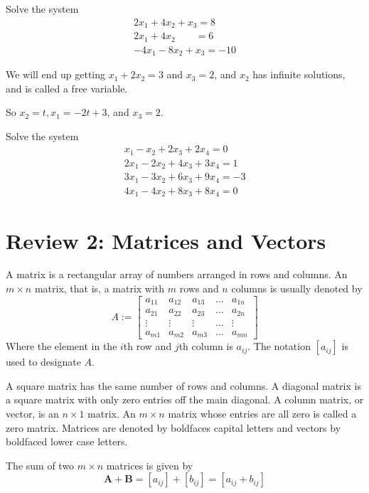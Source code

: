 \documentclass[../diffeq.tex]{subfiles}
\begin{document}
\begin{example}
    Solve the system 
    \begin{align*}
        2x_1+4x_2+x_3=8\\
        2x_1+4x_2\qquad =6\\
        -4x_1-8x_2+x_3=-10
    \end{align*}

    We will end up getting $x_1+2x_2=3$ and $x_3=2$, and $x_2$ has infinite solutions, and is called a free variable.

    So $x_2=t, x_1=-2t+3$, and $x_3=2$.
\end{example}

\ex Solve the system 
\begin{align*}
    x_1-x_2+2x_3+2x_4=0\\
    2x_1-2x_2+4x_3+3x_4=1\\
    3x_1-3x_2+6x_3+9x_4=-3\\
    4x_1-4x_2+8x_3+8x_4=0
\end{align*}


\section{Review 2: Matrices and Vectors}
A matrix is a rectangular array of numbers arranged in rows and columns. An $m\times n$ matrix, that is, a matrix with $m$ rows and $n$ columns is usually denoted by 
\[ A:= 
\begin{bmatrix}
    a_{11} & a_{12} & a_{13} & \dots & a_{1n}\\
    a_{21} & a_{22} & a_{23} & \dots & a_{2n}\\
    \vdots & \vdots & \vdots & \dots & \vdots\\
    a_{m1} & a_{m2} & a_{m3} & \dots & a_{mn}
\end{bmatrix}
\]
Where the element in the $i$th row and $j$th column is $a_{ij}$. The notation $[a_{ij}]$ is used to designate $A$.

A square matrix has the same number of rows and columns. A diagonal matrix is a square matrix with only zero entries off the main diagonal. A column matrix, or vector, is an $n\times 1$ matrix.
An $m\times n$ matrix whose entries are all zero is called a zero matrix. Matrices are denoted by boldfaces capital letters and vectors by boldfaced lower case letters.

The sum of two $m\times n$ matrices is given by 
\[ \textbf{A}+\textbf{B}=[a_{ij}]+[b_{ij}]=[a_{ij}+b_{ij}] \]
\end{document}
